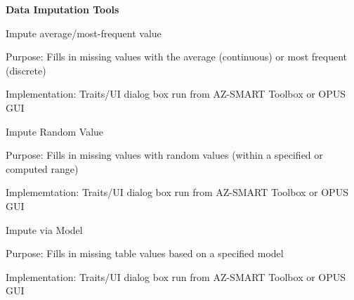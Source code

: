 \bigskip

\textbf{Data Imputation Tools}

\bigskip

Impute average/most-frequent value

Purpose: Fills in missing values with the average (continuous) or most frequent
(discrete)

Implementation: Traits/UI dialog box run from AZ-SMART Toolbox or OPUS GUI

\bigskip

Impute Random Value

Purpose: Fills in missing  values with random values (within a specified or computed range)

Implememtation: Traits/UI dialog box run from AZ-SMART Toolbox or OPUS GUI

\bigskip

Impute via Model

Purpose: Fills in missing table values based on a specified model

Implementation: Traits/UI dialog box run from AZ-SMART Toolbox or OPUS GUI

\bigskip
